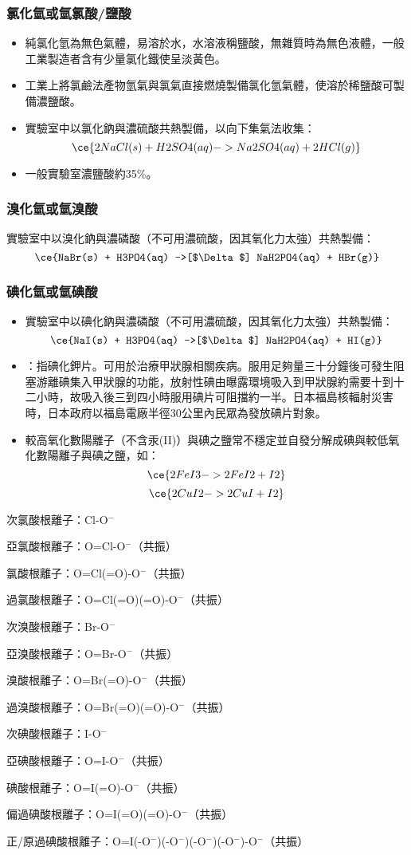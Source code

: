 \documentclass[a4paper,12pt]{report}
\begin{document}
\subsubsection{氯化氫或氫氯酸/鹽酸}
\begin{itemize}
\item 純氯化氫為無色氣體，易溶於水，水溶液稱鹽酸，無雜質時為無色液體，一般工業製造者含有少量氯化鐵使呈淡黃色。
\item 工業上將氯鹼法產物氫氣與氯氣直接燃燒製備氯化氫氣體，使溶於稀鹽酸可製備濃鹽酸。
\item 實驗室中以氯化鈉與濃硫酸共熱製備，以向下集氣法收集：
\[\ce{2NaCl(s) + H2SO4(aq) -> Na2SO4(aq) + 2HCl(g)}\]
\item 一般實驗室濃鹽酸約35\%。
\end{itemize}
\subsubsection{溴化氫或氫溴酸}
實驗室中以溴化鈉與濃磷酸（不可用濃硫酸，因其氧化力太強）共熱製備：
\[\ce{NaBr(s) + H3PO4(aq) ->[$\Delta$] NaH2PO4(aq) + HBr(g)}\]
\subsubsection{碘化氫或氫碘酸}
\begin{itemize}
\item 實驗室中以碘化鈉與濃磷酸（不可用濃硫酸，因其氧化力太強）共熱製備：
\[\ce{NaI(s) + H3PO4(aq) ->[$\Delta$] NaH2PO4(aq) + HI(g)}\]
\item {}：指碘化鉀片。可用於治療甲狀腺相關疾病。服用足夠量三十分鐘後可發生阻塞游離碘集入甲狀腺的功能，放射性碘由曝露環境吸入到甲狀腺約需要十到十二小時，故吸入後三到四小時服用碘片可阻擋約一半。日本福島核輻射災害時，日本政府以福島電廠半徑30公里內民眾為發放碘片對象。
\item 較高氧化數陽離子（不含汞(II)）與碘之鹽常不穩定並自發分解成碘與較低氧化數陽離子與碘之鹽，如：
\[\ce{2FeI3 -> 2FeI2 + I2}\]
\[\ce{2CuI2 -> 2CuI + I2}\]
\end{itemize}
\bit
\item 次氯酸根離子：Cl-O$^-$
\item 亞氯酸根離子：O=Cl-O$^-$（共振）
\item 氯酸根離子：O=Cl(=O)-O$^-$（共振）
\item 過氯酸根離子：O=Cl(=O)(=O)-O$^-$（共振）
\item 次溴酸根離子：Br-O$^-$
\item 亞溴酸根離子：O=Br-O$^-$（共振）
\item 溴酸根離子：O=Br(=O)-O$^-$（共振）
\item 過溴酸根離子：O=Br(=O)(=O)-O$^-$（共振）
\item 次碘酸根離子：I-O$^-$
\item 亞碘酸根離子：O=I-O$^-$（共振）
\item 碘酸根離子：O=I(=O)-O$^-$（共振）
\item 偏過碘酸根離子：O=I(=O)(=O)-O$^-$（共振）
\item 正/原過碘酸根離子：O=I(-O$^-$)(-O$^-$)(-O$^-$)(-O$^-$)-O$^-$（共振）
\eit
\end{document}
